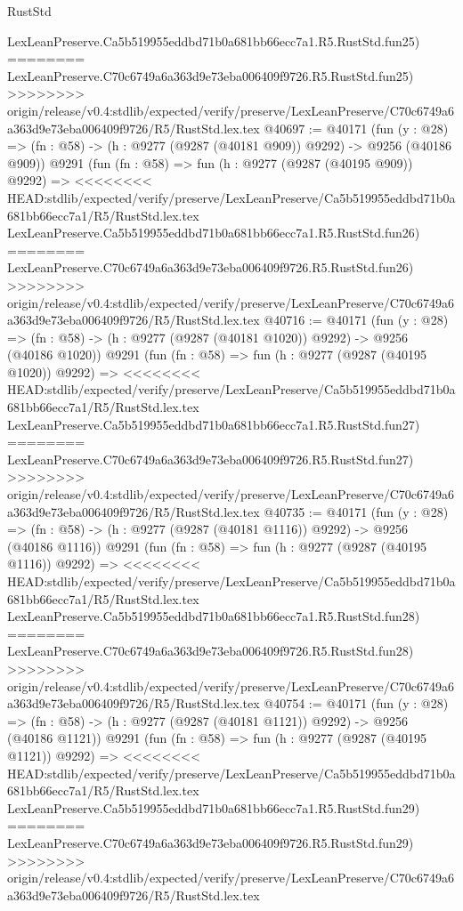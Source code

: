 \begin{lexlean}{RustStd}
\begin{coremodule}
{\begin{coremodule}
{{{{{{{{{{{{{{{{{{{{{{{{{{{{{{{{{{{{{{{{{{{{{{{{{{{{{{{    LexLeanPreserve.Ca5b519955eddbd71b0a681bb66ecc7a1.R5.RustStd.fun25)
========
    LexLeanPreserve.C70c6749a6a363d9e73eba006409f9726.R5.RustStd.fun25)
>>>>>>>> origin/release/v0.4:stdlib/expected/verify/preserve/LexLeanPreserve/C70c6749a6a363d9e73eba006409f9726/R5/RustStd.lex.tex
@40697 := @40171
    (fun (y : @28) => (fn : @58) -> (h : @9277 (@9287 (@40181 @909)) @9292) -> @9256 (@40186 @909))
    @9291
    (fun (fn : @58) =>
    fun (h : @9277 (@9287 (@40195 @909)) @9292) =>
<<<<<<<< HEAD:stdlib/expected/verify/preserve/LexLeanPreserve/Ca5b519955eddbd71b0a681bb66ecc7a1/R5/RustStd.lex.tex
    LexLeanPreserve.Ca5b519955eddbd71b0a681bb66ecc7a1.R5.RustStd.fun26)
========
    LexLeanPreserve.C70c6749a6a363d9e73eba006409f9726.R5.RustStd.fun26)
>>>>>>>> origin/release/v0.4:stdlib/expected/verify/preserve/LexLeanPreserve/C70c6749a6a363d9e73eba006409f9726/R5/RustStd.lex.tex
@40716 := @40171
    (fun (y : @28) =>
    (fn : @58) -> (h : @9277 (@9287 (@40181 @1020)) @9292) -> @9256 (@40186 @1020))
    @9291
    (fun (fn : @58) =>
    fun (h : @9277 (@9287 (@40195 @1020)) @9292) =>
<<<<<<<< HEAD:stdlib/expected/verify/preserve/LexLeanPreserve/Ca5b519955eddbd71b0a681bb66ecc7a1/R5/RustStd.lex.tex
    LexLeanPreserve.Ca5b519955eddbd71b0a681bb66ecc7a1.R5.RustStd.fun27)
========
    LexLeanPreserve.C70c6749a6a363d9e73eba006409f9726.R5.RustStd.fun27)
>>>>>>>> origin/release/v0.4:stdlib/expected/verify/preserve/LexLeanPreserve/C70c6749a6a363d9e73eba006409f9726/R5/RustStd.lex.tex
@40735 := @40171
    (fun (y : @28) =>
    (fn : @58) -> (h : @9277 (@9287 (@40181 @1116)) @9292) -> @9256 (@40186 @1116))
    @9291
    (fun (fn : @58) =>
    fun (h : @9277 (@9287 (@40195 @1116)) @9292) =>
<<<<<<<< HEAD:stdlib/expected/verify/preserve/LexLeanPreserve/Ca5b519955eddbd71b0a681bb66ecc7a1/R5/RustStd.lex.tex
    LexLeanPreserve.Ca5b519955eddbd71b0a681bb66ecc7a1.R5.RustStd.fun28)
========
    LexLeanPreserve.C70c6749a6a363d9e73eba006409f9726.R5.RustStd.fun28)
>>>>>>>> origin/release/v0.4:stdlib/expected/verify/preserve/LexLeanPreserve/C70c6749a6a363d9e73eba006409f9726/R5/RustStd.lex.tex
@40754 := @40171
    (fun (y : @28) =>
    (fn : @58) -> (h : @9277 (@9287 (@40181 @1121)) @9292) -> @9256 (@40186 @1121))
    @9291
    (fun (fn : @58) =>
    fun (h : @9277 (@9287 (@40195 @1121)) @9292) =>
<<<<<<<< HEAD:stdlib/expected/verify/preserve/LexLeanPreserve/Ca5b519955eddbd71b0a681bb66ecc7a1/R5/RustStd.lex.tex
    LexLeanPreserve.Ca5b519955eddbd71b0a681bb66ecc7a1.R5.RustStd.fun29)
========
    LexLeanPreserve.C70c6749a6a363d9e73eba006409f9726.R5.RustStd.fun29)
>>>>>>>> origin/release/v0.4:stdlib/expected/verify/preserve/LexLeanPreserve/C70c6749a6a363d9e73eba006409f9726/R5/RustStd.lex.tex
}}}}}}}}}}}}}}}}}}}}}}}}}}}}}}}}}}}}}}}}}}}}}}}}}}}}}}}
\end{coremodule}}
\end{coremodule}
\end{lexlean}
